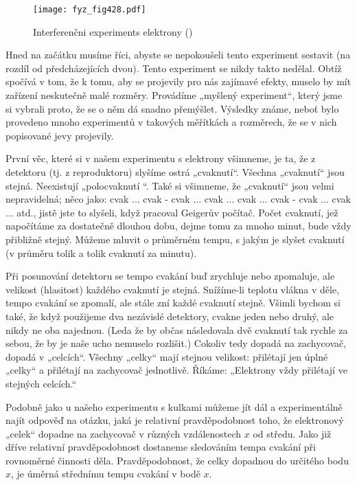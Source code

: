     \begin{figure}[ht!] %
      \centering
      \texttt{[image: fyz\_fig428.pdf]}
      \caption{Interferenčni experiments elektrony
              (\cite[s.~697]{Feynman01})}
      \label{fyz:fig428}
    \end{figure}

    Hned na začátku musíme říci, abyste se nepokoušeli tento experiment sestavit (na rozdíl od
    předcházejících dvou). Tento experiment se nikdy takto nedělal. Obtíž spočívá v tom, že k tomu,
    aby se projevily pro nás zajímavé efekty, muselo by mít zařízení neskutečně malé rozměry.
    Provádíme „myšlený experiment“, který jsme si vybrali proto, že se o něm dá snadno přemýšlet.
    Výsledky známe, neboť bylo provedeno mnoho experimentů v takových měřítkách a rozměrech, že se v
    nich popisované jevy projevily.
    
    První věc, které si v našem experimentu s elektrony všimneme, je ta, že z detektoru (tj. z
    reproduktoru) slyšíme ostrá „cvaknutí“. Všechna „cvaknutí“ jsou stejná. Neexistují „polocvaknutí
    “. Také si všimneme, že „cvaknutí“ jsou velmi nepravidelná; něco jako: cvak ... cvak - cvak ...
    cvak ... cvak ... cvak - cvak ... cvak ... atd., jistě jste to slyšeli, když pracoval Geigerův
    počítač. Počet cvaknutí, jež napočítáme za dostatečně dlouhou dobu, dejme tomu za mnoho minut,
    bude vždy přibližně stejný. Můžeme mluvit o průměrném tempu, s jakým je slyšet cvaknutí (v
    průměru tolik a tolik cvaknutí za minutu).

    Při posunování detektoru se tempo cvakání buď zrychluje nebo zpomaluje, ale velikost (hlasitost)
    každého cvaknutí je stejná. Snížíme-li teplotu vlákna v děle, tempo cvakání se zpomalí, ale
    stále zní každé cvaknutí stejně. Všimli bychom si také, že když použijeme dva nezávislé
    detektory, cvakne jeden nebo druhý, ale nikdy ne oba najednou. (Leda že by občas následovala dvě
    cvaknutí tak rychle za sebou, že by je naše ucho nemuselo rozlišit.) Cokoliv tedy dopadá na
    zachycovač, dopadá v „celcích“. Všechny „celky“ mají stejnou velikost: přilétají jen úplné
    „celky“ a přilétají na zachycovač jednotlivě. Říkáme: „Elektrony vždy přilétají ve stejných
    celcích.“ 
    
    Podobně jako u našeho experimentu s kulkami můžeme jít dál a experimentálně najít odpověď na
    otázku, jaká je relativní pravděpodobnost toho, že elektronový „celek“ dopadne na zachycovač v
    různých vzdálenostech \(x\) od středu. Jako již dříve relativní pravděpodobnost dostaneme
    sledováním tempa cvakání při rovnoměrné činnosti děla. Pravděpodobnost, že celky dopadnou do
    určitého bodu \(x\), je úměrná střednímu tempu cvakání v bodě \(x\).
    
